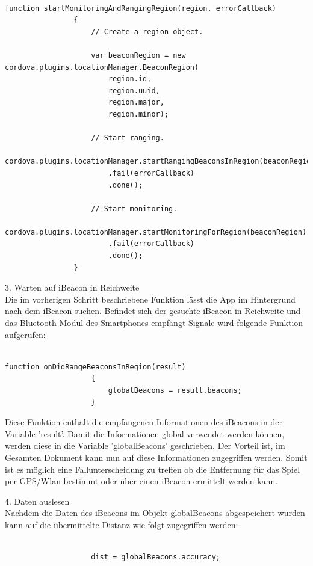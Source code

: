 \begin{lstlisting}[frame=single]  % Start your code-block

function startMonitoringAndRangingRegion(region, errorCallback)
				{
					// Create a region object.
					
					var beaconRegion = new cordova.plugins.locationManager.BeaconRegion(
						region.id,
						region.uuid,
						region.major,
						region.minor);

					// Start ranging.
					cordova.plugins.locationManager.startRangingBeaconsInRegion(beaconRegion)
						.fail(errorCallback)
						.done();

					// Start monitoring.
					cordova.plugins.locationManager.startMonitoringForRegion(beaconRegion)
						.fail(errorCallback)
						.done();
				}
\end{lstlisting}


3. Warten auf iBeacon in Reichweite
\\Die im vorherigen Schritt beschriebene Funktion lässt die App im Hintergrund nach dem iBeacon suchen. Befindet sich der gesuchte iBeacon in Reichweite und das Bluetooth Modul des Smartphones empfängt Signale wird folgende Funktion aufgerufen:

\begin{lstlisting}[frame=single]  % Start your code-block

function onDidRangeBeaconsInRegion(result)
					{
						globalBeacons = result.beacons;
					}
\end{lstlisting}

Diese Funktion enthält die empfangenen Informationen des iBeacons in der Variable 'result'. Damit die Informationen global verwendet werden können, werden diese in die Variable 'globalBeacons' geschrieben. Der Vorteil ist, im Gesamten Dokument kann nun auf diese Informationen zugegriffen werden. Somit ist es möglich eine Fallunterscheidung zu treffen ob die Entfernung für das Spiel per GPS/Wlan bestimmt oder über einen iBeacon ermittelt werden kann.


4. Daten auslesen
\\Nachdem die Daten des iBeacons im Objekt globalBeacons abgespeichert wurden kann auf die übermittelte Distanz wie folgt zugegriffen werden:

\begin{lstlisting}[frame=single]  % Start your code-block

					dist = globalBeacons.accuracy;
					
\end{lstlisting}


